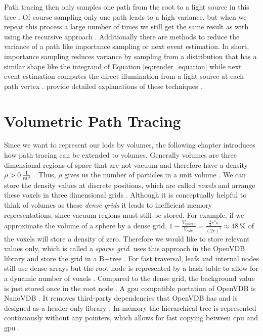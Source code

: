 Path tracing then only samples one path from the root to a light source in this tree \cite{rendering_equation}.
Of course sampling only one path leads to a high variance, but when we repeat this process a large number of times we still get the same result as with using the recursive approach \cite{pbr}.
Additionally there are methods to reduce the variance of a path like importance sampling or next event estimation.
In short, importance sampling reduces variance by sampling from a distribution that has a similar shape like the integrand of Equation \ref{eq:render_equation} while next event estimation computes the direct illumination from a light source at each path vertex \cite{pbr}.
\citeauthor{pbr} provide detailed explanations of these techniques \cite{pbr}.

\section{Volumetric Path Tracing}
Since we want to represent our \acsp{lod} by volumes, the following chapter introduces how path tracing can be extended to volumes.
Generally volumes are three dimensional regions of space that are not vacuum and therefore have a density ${\rho > \SI{0}{\frac{1}{\m^3}}}$ \cite{pbr}.
Thus, $\rho$ gives us the number of particles in a unit volume \cite{novak_overview}.
We can store the density values at discrete positions, which are called \textit{voxels} and arrange these voxels in three dimensional grids \cite{pbr}.
Although it is conceptually helpful to think of volumes as these \textit{dense grids} it leads to inefficient memory representations, since vacuum regions must still be stored.
For example, if we approximate the volume of a sphere by a dense grid, $1 - \frac{V_{sphere}}{V_{cube}} = \frac{\frac{4}{3}r^3\pi}{(2r)^3}\approx \SI{48}{\%}$ of the voxels will store a density of zero.
Therefore we would like to store relevant values only, which is called a \textit{sparse grid}.
\citeauthor{museth_vdb} uses this approach in the OpenVDB library and store the grid in a B+tree \cite{museth_vdb}.
For fast traversal, leafs and internal nodes still use dense arrays but the root node is represented by a hash table to allow for a dynamic number of voxels \cite{museth_vdb}.
Compared to the dense grid, the background value is just stored once in the root node \cite{museth_vdb}.
A \ac{gpu} compatible portation of OpenVDB is NanoVDB \cite{museth_nanovdb}.
It removes third-party dependencies that OpenVDB has and is designed as a header-only library \cite{museth_nanovdb}.
In memory the hierarchical tree is represented continuously without any pointers, which allows for fast copying between \ac{cpu} and \ac{gpu} \cite{museth_nanovdb}.

